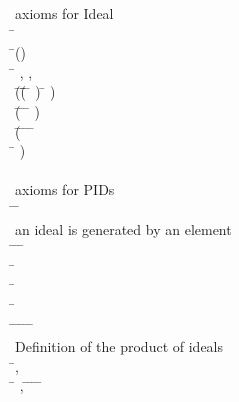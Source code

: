 \begin{hetcasl}
\> {\small{}\KW{\%\%}axioms for Ideal}\\
\> \Ax{\forall} \= \Ax{:}  \\
\> \Ax{\bullet} \=() \\
\>\> \Ax{\Leftrightarrow} \=\Ax{\forall} , ,  \Ax{:}  \\
\>\>\> \Ax{\bullet} \=(\=(\=   \Ax{\Rightarrow} \=  ) \Ax{\wedge} \=  ) \\
\>\>\>\> \Ax{\wedge} (\=   \Ax{\wedge} \=   \Ax{\Rightarrow} \= \Ax{*}   ) \\
\>\>\>\> \Ax{\wedge} (\=   \Ax{\wedge} \=   \Ax{\wedge} \=   \Ax{\wedge} \= \Ax{+}  \Ax{=}  \\
\>\>\>\>\> \Ax{\Rightarrow} \= \Ax{+}   )\\
\> \\
\> {\small{}\KW{\%\%}axioms for PID\Ax{-}s}\\
\> \PRED \=\Ax{\_\_}\Ax{\_\_} \Ax{:} \= \Ax{\times} \\
\>\> {\small{}\KW{\%\%}an ideal is generated by an element}\\
\> \Ax{\forall} \= \Ax{:}  \Ax{\bullet} \=\Ax{\exists}  \Ax{:}  \Ax{\bullet} \=  \\
\> \Ax{\forall} \= \Ax{:}  \\
\> \Ax{\bullet} \=\Ax{\forall}  \Ax{:}  \\
\>\> \Ax{\bullet} \=   \\
\>\>\> \Ax{\Leftrightarrow} \=\Ax{\forall}  \Ax{:}  \Ax{\bullet} \=   \Ax{\Rightarrow} \=\Ax{\exists}  \Ax{:}  \Ax{\bullet} \= \Ax{=} \= \Ax{*} \\
\> {\small{}\KW{\%\%} Definition of the product of ideals}\\
\> \Ax{\forall} \=,  \Ax{:}  \\
\> \Ax{\bullet} \=\Ax{\forall} ,  \Ax{:}  \Ax{\bullet} \=   \Ax{\wedge} \=   \Ax{\Rightarrow} \= \Ax{*}   \= \Ax{**} \\

\end{hetcasl}
